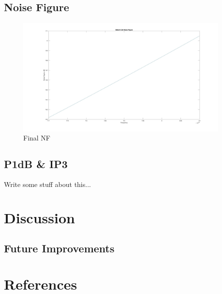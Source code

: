\documentclass{article}                                                         %
\begin{document}
\subsection{Noise Figure}
\begin{figure}[H]
  \centering
  \includegraphics[width=0.95\textwidth] {Plots/NF.jpg}
  \caption{Final NF}
    \label{fig:matNF}
\end{figure}

\subsection{P1dB \& IP3}
Write some stuff about this...
\newpage
\section{Discussion}
\subsection{Future Improvements}


\section{References}
\printbibliography[heading=none]
\end{document}

